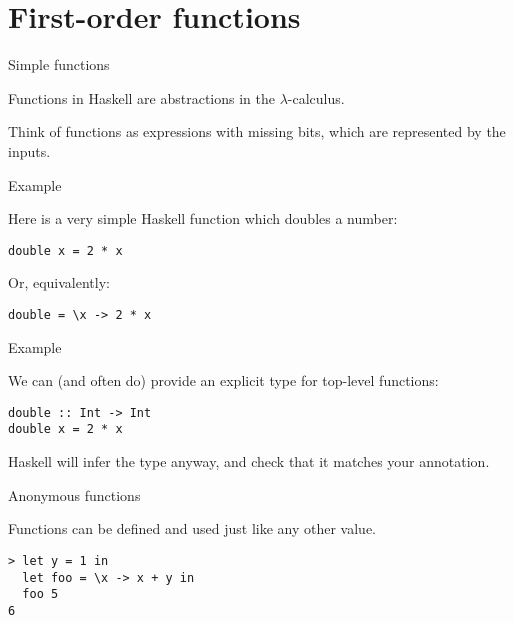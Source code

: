 
\section{First-order functions}

%
\begin{frame}[fragile]{Simple functions}

Functions in Haskell are abstractions in the $\lambda$-calculus. 

Think of functions as expressions with missing bits, which are represented by
the inputs.

\end{frame}

%
\begin{frame}[fragile]{Example}

Here is a very simple Haskell function which doubles a number:

\begin{block}{}
\begin{verbatim}
double x = 2 * x
\end{verbatim}
\end{block}

Or, equivalently:

\begin{block}{}
\begin{verbatim}
double = \x -> 2 * x
\end{verbatim}
\end{block}

\end{frame}

%
\begin{frame}[fragile]{Example}

We can (and often do) provide an explicit type for top-level functions:

\begin{block}{}
\begin{verbatim}
double :: Int -> Int
double x = 2 * x
\end{verbatim}
\end{block}

Haskell will infer the type anyway, and check that it matches your annotation.

\end{frame}

%
\begin{frame}[fragile]{Anonymous functions}

Functions can be defined and used just like any other value.

\begin{block}{}
\begin{verbatim}
> let y = 1 in 
  let foo = \x -> x + y in 
  foo 5
6
\end{verbatim}
\end{block}

\end{frame}

